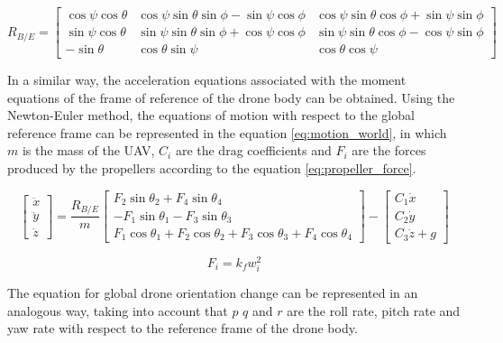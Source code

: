 \documentclass[a4paper, 12pt, oneside]{book}
\begin{document}
\begin{equation}
R_{B/E} = 
\begin{bmatrix}
    \cos\psi\cos\theta & \cos\psi\sin\theta\sin\phi-\sin\psi\cos\phi & \cos\psi\sin\theta\cos\phi+\sin\psi\sin\phi\\ 
    \sin\psi\cos\theta & \sin\psi\sin\theta\sin\phi+\cos\psi\cos\phi & \sin\psi\sin\theta\cos\phi-\cos\psi\sin\phi\\ 
    -\sin\theta & \cos\theta\sin\psi & \cos\theta\cos\psi
\end{bmatrix}
\label{eq:rotationBE}
\end{equation}

In a similar way, the acceleration equations associated with the moment equations of the frame of reference of the drone body can be obtained. Using the Newton-Euler method, the equations of motion with respect to the global reference frame can be represented in the equation \ref{eq:motion_world}, in which $m$ is the mass of the UAV, $C_i$ are the drag coefficients and $F_i$ are the forces produced by the propellers according to the equation \ref{eq:propeller_force}.

\begin{equation}
\begin{bmatrix}
\ddot{x}\\ 
\ddot{y}\\ 
\ddot{z}
\end{bmatrix}
=
\frac{R_{B/E}}{m}
\begin{bmatrix}
F_2\sin\theta_2+F_4\sin\theta_4\\ 
-F_1\sin\theta_1-F_3\sin\theta_3\\ 
F_1\cos\theta_1+F_2\cos\theta_2+F_3\cos\theta_3+F_4\cos\theta_4
\end{bmatrix}
-
\begin{bmatrix}
C_1\dot{x}\\ 
C_2\dot{y}\\ 
C_3\dot{z}+g
\end{bmatrix}
\label{eq:motion_world}
\end{equation}

\begin{equation}
F_i=k_fw_i^2
\label{eq:propeller_force}
\end{equation}

The equation for global drone orientation change can be represented in an analogous way, taking into account that $p$ $q$ and $r$ are the roll rate, pitch rate and yaw rate with respect to the reference frame of the drone body.
\end{document}
